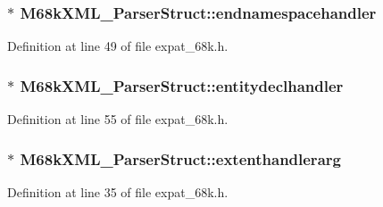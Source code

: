 \subsubsection[{\texorpdfstring{endnamespacehandler}{endnamespacehandler}}]{$\ast$ M68k\+X\+M\+L\+\_\+\+Parser\+Struct\+::endnamespacehandler}\hypertarget{struct_m68k_x_m_l___parser_struct_a6c1563494a2844d7a5f9c282f9fbc359}{}\label{struct_m68k_x_m_l___parser_struct_a6c1563494a2844d7a5f9c282f9fbc359}


Definition at line 49 of file expat\+\_\+68k.\+h.

\subsubsection[{\texorpdfstring{entitydeclhandler}{entitydeclhandler}}]{$\ast$ M68k\+X\+M\+L\+\_\+\+Parser\+Struct\+::entitydeclhandler}\hypertarget{struct_m68k_x_m_l___parser_struct_a286c6fe9bc4206210e8cd9344f63dade}{}\label{struct_m68k_x_m_l___parser_struct_a286c6fe9bc4206210e8cd9344f63dade}


Definition at line 55 of file expat\+\_\+68k.\+h.

\subsubsection[{\texorpdfstring{extenthandlerarg}{extenthandlerarg}}]{$\ast$ M68k\+X\+M\+L\+\_\+\+Parser\+Struct\+::extenthandlerarg}\hypertarget{struct_m68k_x_m_l___parser_struct_a97f2ba975e1a79d83aaa4a2f80d1a022}{}\label{struct_m68k_x_m_l___parser_struct_a97f2ba975e1a79d83aaa4a2f80d1a022}


Definition at line 35 of file expat\+\_\+68k.\+h.

